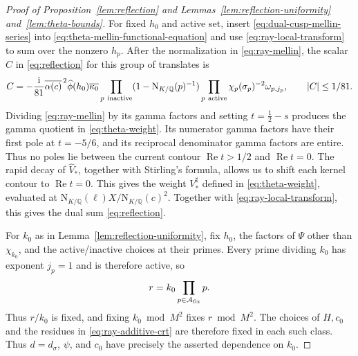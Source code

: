 \documentclass[11pt,a4paper]{article}
\numberwithin{equation}{section}
\numberwithin{figure}{section}
\theoremstyle{definition}
\theoremstyle{remark}
\newcommand{\Q}{\mathbb Q}
\newcommand{\NK}{\mathrm N_{K/\Q}}
\newcommand{\Rea}{\operatorname{Re}}
\begin{document}
\begin{proof}[Proof of Proposition~\ref{lem:reflection} and Lemmas~\ref{lem:reflection-uniformity} and~\ref{lem:theta-bounds}]
For fixed $h_0$ and active set, insert
\eqref{eq:dual-cusp-mellin-series} into
\eqref{eq:theta-mellin-functional-equation} and use
\eqref{eq:ray-local-transform} to sum over the nonzero $h_p$.
After the normalization in \eqref{eq:ray-mellin}, the scalar $C$
in \eqref{eq:reflection} for this group of translates is
\[
 C=-\frac{\mathrm i}{81}\overline{\alpha(c)}^{\,2}
 \widehat\phi(h_0)\overline{\kappa_0}
 \prod_{p\ {\rm inactive}}(1-\NK(p)^{-1})
 \prod_{p\ {\rm active}}\chi_p(\sigma_p)^{-2}\omega_{p,j_p},
 \qquad |C|\le1/81 .
\]
Dividing \eqref{eq:ray-mellin} by its gamma factors and setting
$t=\tfrac12-s$ produces the gamma quotient in
\eqref{eq:theta-weight}. Its numerator gamma factors have their
first pole at $t=-5/6$, and its reciprocal denominator gamma
factors are entire. Thus no poles lie between the current contour
$\Rea t>1/2$ and $\Rea t=0$. The rapid decay of $\widehat V_*$,
together with Stirling's formula, allows us to shift each kernel
contour to $\Rea t=0$. This gives the weight $V_*^\sharp$ defined in
\eqref{eq:theta-weight}, evaluated at $\NK(\ell)X/\NK(c)^2$.
Together with \eqref{eq:ray-local-transform}, this gives the dual
sum \eqref{eq:reflection}.

For $k_0$ as in %
Lemma~\ref{lem:reflection-uniformity}, fix $h_0$, the factors of $\Psi$
other than $\chi_{k_0}$, and the active/inactive choices at their
primes. Every prime dividing $k_0$ has exponent $j_p=1$ and is
therefore active, so
\[
 r=k_0\prod_{p\in\mathcal A_{\rm fix}}p.
\]
Thus $r/k_0$ is fixed, and fixing $k_0\bmod M^2$ fixes $r\bmod M^2$.
The choices of $H,c_0$ and the residues in
\eqref{eq:ray-additive-crt} are therefore fixed in each such
class. Thus $d=d_\sigma$, $\psi$, and $c_0$ have precisely the asserted
dependence on $k_0$.


\end{proof}
\end{document}
